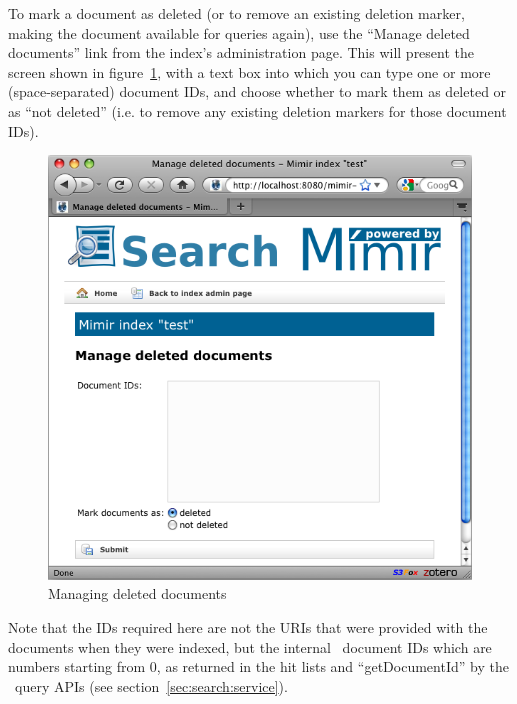 To mark a document as deleted (or to remove an existing deletion marker, making
the document available for queries again), use the ``Manage deleted documents''
link from the index's administration page.  This will present the screen shown
in figure~\ref{fig:deleted-documents}, with a text box into which you can type
one or more (space-separated) document IDs, and choose whether to mark them as
deleted or as ``not deleted'' (i.e. to remove any existing deletion markers for
those document IDs).
%
\begin{figure}[htb!]
\begin{center}
\includegraphics[scale=0.5]{img/deleted-documents}
\end{center}
\caption{Managing deleted documents}
\label{fig:deleted-documents}
\end{figure}

Note that the IDs required here are not the URIs that were provided with the
documents when they were indexed, but the internal \Mimir\ document IDs which
are numbers starting from 0, as returned in the hit lists and ``getDocumentId''
by the \Mimir\ query APIs (see section~\ref{sec:search:service}).